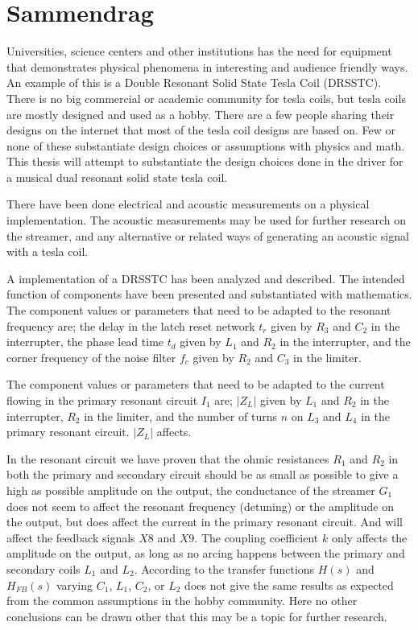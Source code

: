 \section*{Sammendrag}
Universities, science centers and other institutions has the need for equipment that demonstrates physical phenomena in interesting and audience friendly ways. An example of this is a Double Resonant Solid State Tesla Coil (DRSSTC). There is no big commercial or academic community for tesla coils, but tesla coils are mostly designed and used as a hobby. There are a few people sharing their designs on the internet that most of the tesla coil designs are based on. Few or none of these substantiate design choices or assumptions with physics and math. This thesis will attempt to substantiate the design choices done in the driver for a musical dual resonant solid state tesla coil.

There have been done electrical and acoustic measurements on a physical implementation. The acoustic measurements may be used for further research on the streamer, and any alternative or related ways of generating an acoustic signal with a tesla coil.

A implementation of a DRSSTC has been analyzed and described. The intended function of components have been presented and substantiated with mathematics. The component values or parameters that need to be adapted to the resonant frequency are; the delay in the latch reset network $t_r$ given by $R_3$ and $C_2$ in the interrupter, the phase lead time $t_d$ given by $L_1$ and $R_2$ in the interrupter, and the corner frequency of the noise filter $f_c$ given by $R_2$ and $C_3$ in the limiter.

The component values or parameters that need to be adapted to the current flowing in the primary resonant circuit $I_1$ are; $|Z_L|$ given by $L_1$ and $R_2$ in the interrupter, $R_2$ in the limiter, and the number of turns $n$ on $L_3$ and $L_4$ in the primary resonant circuit. $|Z_L|$ affects.

In the resonant circuit we have proven that the ohmic resistances $R_1$ and $R_2$ in both the primary and secondary circuit should be as small as possible to give a high as possible amplitude on the output, the conductance of the streamer $G_1$ does not seem to affect the resonant frequency (detuning) or the amplitude on the output, but does affect the current in the primary resonant circuit. And will affect the feedback signals $X8$ and $X9$. The coupling coefficient $k$ only affects the amplitude on the output, as long as no arcing happens between the primary and secondary coils $L_1$ and $L_2$. According to the transfer functions $H(s)$ and $H_{FB}(s)$ varying $C_1$, $L_1$, $C_2$, or $L_2$ does not give the same results as expected from the common assumptions in the hobby community. Here no other conclusions can be drawn other that this may be a topic for further research.
